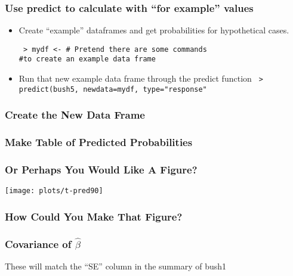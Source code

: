 \documentclass[10pt,english]{beamer}
\begin{document}
\begin{frame}
  \frametitle{Use predict to calculate with ``for example'' values}
  \begin{itemize}
  \item Create ``example'' dataframes and get probabilities for
    hypothetical cases.

    \texttt{ > mydf <- \# Pretend there are some commands \\ \#to
      create an example data frame}

  \item Run that new example data frame through the predict function
    \texttt{ > predict(bush5, newdata=mydf, type="response"}

   \end{itemize}
 \end{frame}





\begin{frame}[containsverbatim]
  \frametitle{Create the New Data Frame}

\footnotesize{

}

\end{frame}

\begin{frame}[containsverbatim]
  \frametitle{Make Table of Predicted Probabilities}




\end{frame}

\begin{frame}
  \frametitle{Or Perhaps You Would Like A Figure?}


\texttt{[image: plots/t-pred90]}
\end{frame}


\begin{frame}[containsverbatim]
  \frametitle{How Could You Make That Figure?}

  
\end{frame}



\begin{frame}
  \frametitle{Covariance of $\hat{\beta}$}


These will match the ``SE'' column in the summary of bush1

\end{frame}
\end{document}
